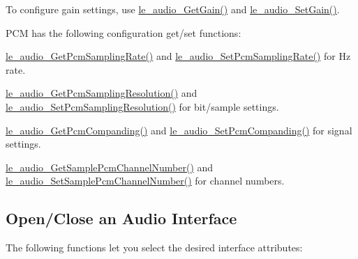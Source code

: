 To configure gain settings, use \hyperlink{le__audio__interface_8h_a51a86829cdd6f27234f482e5dbb6c933}{le\+\_\+audio\+\_\+\+Get\+Gain()} and \hyperlink{le__audio__interface_8h_ad62587dacf0cb087697a62fb9f41d938}{le\+\_\+audio\+\_\+\+Set\+Gain()}.

P\+C\+M has the following configuration get/set functions\+:
\begin{DoxyItemize}
\item \hyperlink{le__audio__interface_8h_a36779982278d3f965286582f38917247}{le\+\_\+audio\+\_\+\+Get\+Pcm\+Sampling\+Rate()} and \hyperlink{le__audio__interface_8h_ae7c9d76c5377ad5fae13b24477827f45}{le\+\_\+audio\+\_\+\+Set\+Pcm\+Sampling\+Rate()} for Hz rate.
\item \hyperlink{le__audio__interface_8h_a70fbe5e1ae02033e89ad04bbf1ed2b39}{le\+\_\+audio\+\_\+\+Get\+Pcm\+Sampling\+Resolution()} and \hyperlink{le__audio__interface_8h_ab3678e77c8d69f248cd339042bd824cc}{le\+\_\+audio\+\_\+\+Set\+Pcm\+Sampling\+Resolution()} for bit/sample settings.
\item \hyperlink{le__audio__interface_8h_aab9a28f3c695b90f8b9f622eb401f6cf}{le\+\_\+audio\+\_\+\+Get\+Pcm\+Companding()} and \hyperlink{le__audio__interface_8h_a593682daa95aec349e48144f5b46c658}{le\+\_\+audio\+\_\+\+Set\+Pcm\+Companding()} for signal settings.
\item \hyperlink{le__audio__interface_8h_a40bf3633c3050a7526a100562edc97f9}{le\+\_\+audio\+\_\+\+Get\+Sample\+Pcm\+Channel\+Number()} and \hyperlink{le__audio__interface_8h_aae7db9f0933119fb5a61162722b3274a}{le\+\_\+audio\+\_\+\+Set\+Sample\+Pcm\+Channel\+Number()} for channel numbers.
\end{DoxyItemize}\hypertarget{c_audio_le_audio_interfaces}{}\subsection{Open/\+Close an Audio Interface}\label{c_audio_le_audio_interfaces}
The following functions let you select the desired interface attributes\+:
